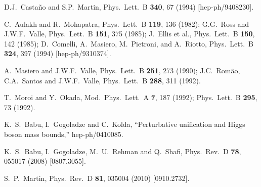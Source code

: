 \documentclass[11pt]{article}
\begin{document}
\begin{thebibliography}{999}
D.J.~Casta\~no and S.P.~Martin,
  Phys.\ Lett.\ B {\bf 340}, 67 (1994)
  [hep-ph/9408230].

C.~Aulakh and R.~Mohapatra,
  Phys.\ Lett.\ B {\bf 119}, 136 (1982);
G.G.~Ross and J.W.F.~Valle,
  Phys.\ Lett.\ B {\bf 151}, 375 (1985);
J.~Ellis et al.,
  Phys.\ Lett.\ B {\bf 150}, 142 (1985);
D.~Comelli, A.~Masiero, M.~Pietroni, and A.~Riotto, 
  Phys.\ Lett.\ B {\bf 324}, 397 (1994)
  [hep-ph/9310374].

A.~Masiero and J.W.F.~Valle, 
  Phys.\ Lett.\ B {\bf 251}, 273 (1990);
J.C.~Rom\~ao, C.A.~Santos and J.W.F.~Valle,
  Phys.\ Lett.\ B {\bf 288}, 311 (1992).

  T.~Moroi and Y.~Okada,
  Mod.\ Phys.\ Lett.\ A {\bf 7}, 187 (1992);
  Phys.\ Lett.\ B {\bf 295}, 73 (1992).
  
  K.~S.~Babu, I.~Gogoladze and C.~Kolda,
  ``Perturbative unification and Higgs boson mass bounds,''
  hep-ph/0410085.

  K.~S.~Babu, I.~Gogoladze, M.~U.~Rehman and Q.~Shafi,
  Phys.\ Rev.\ D {\bf 78}, 055017 (2008)
  [0807.3055].

  S.~P.~Martin,
  Phys.\ Rev.\ D {\bf 81}, 035004 (2010)
  [0910.2732].


\end{thebibliography}
\end{document}
